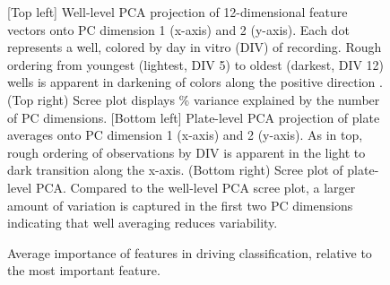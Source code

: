 \documentclass{article}
\begin{document}
\begin{figure}
  \centering
  \caption{[Top left] Well-level PCA projection of 12-dimensional
feature vectors onto PC dimension 1 (x-axis) and 2 (y-axis).  Each dot
represents a well, colored by day in vitro (DIV) of recording. Rough
ordering from youngest (lightest, DIV 5) to oldest (darkest, DIV 12)
wells is apparent in darkening of colors along the positive direction
. (Top right) Scree plot displays \% variance explained by the number
of PC dimensions. [Bottom left] Plate-level PCA projection of plate
averages onto PC dimension 1 (x-axis) and 2 (y-axis).  As in top,
rough ordering of observations by DIV is apparent in the light to dark
transition along the x-axis. (Bottom right) Scree plot of plate-level
PCA. Compared to the well-level PCA scree plot, a larger amount of
variation is captured in the first two PC dimensions indicating that
well averaging reduces variability.
}
\end{figure}

\begin{figure}
  \centering
  \caption{Average importance of features in driving classification,
    relative to the most important feature.}
\end{figure}
\end{document}
